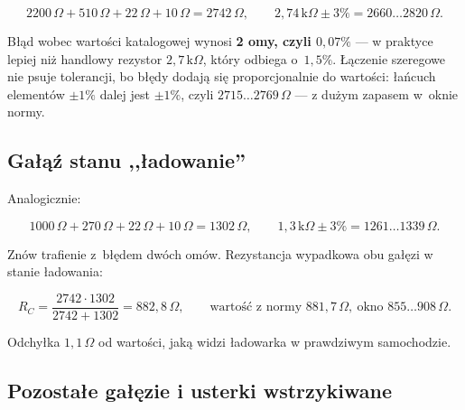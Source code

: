 \documentclass[a4paper,11pt]{article}
\newcommand{\ohm}{\,\Omega}
\newcommand{\kohm}{\,\mathrm{k}\Omega}
\begin{document}
\[
2200\ohm+510\ohm+22\ohm+10\ohm=2742\ohm ,
\qquad
2{,}74\kohm\pm3\%=2660\ldots2820\ohm .
\]

Błąd wobec wartości katalogowej wynosi \textbf{2 omy, czyli $0{,}07\%$} --- w praktyce
lepiej niż handlowy rezystor $2{,}7\kohm$, który odbiega o~$1{,}5\%$. Łączenie szeregowe
nie psuje tolerancji, bo błędy dodają się proporcjonalnie do wartości: łańcuch
elementów $\pm1\%$ dalej jest $\pm1\%$, czyli $2715\ldots2769\ohm$ --- z dużym zapasem
w~oknie normy.

\subsection{Gałąź stanu ,,ładowanie''}

Analogicznie:

\[
1000\ohm+270\ohm+22\ohm+10\ohm=1302\ohm ,
\qquad
1{,}3\kohm\pm3\%=1261\ldots1339\ohm .
\]

Znów trafienie z~błędem dwóch omów. Rezystancja wypadkowa obu gałęzi w stanie
ładowania:

\[
R_C=\frac{2742\cdot1302}{2742+1302}=882{,}8\ohm ,
\qquad
\text{wartość z normy } 881{,}7\ohm,\ \text{okno } 855\ldots908\ohm .
\]

Odchyłka $1{,}1\ohm$ od wartości, jaką widzi ładowarka w prawdziwym samochodzie.

\subsection{Pozostałe gałęzie i usterki wstrzykiwane}
\end{document}

